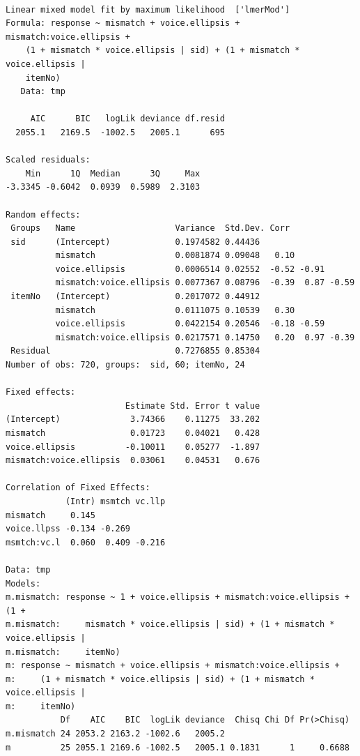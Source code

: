 \documentclass[11pt]{article}
\begin{document}
\begin{verbatim}

Linear mixed model fit by maximum likelihood  ['lmerMod']
Formula: response ~ mismatch + voice.ellipsis + mismatch:voice.ellipsis +  
    (1 + mismatch * voice.ellipsis | sid) + (1 + mismatch * voice.ellipsis |  
    itemNo)
   Data: tmp

     AIC      BIC   logLik deviance df.resid 
  2055.1   2169.5  -1002.5   2005.1      695 

Scaled residuals: 
    Min      1Q  Median      3Q     Max 
-3.3345 -0.6042  0.0939  0.5989  2.3103 

Random effects:
 Groups   Name                    Variance  Std.Dev. Corr             
 sid      (Intercept)             0.1974582 0.44436                   
          mismatch                0.0081874 0.09048   0.10            
          voice.ellipsis          0.0006514 0.02552  -0.52 -0.91      
          mismatch:voice.ellipsis 0.0077367 0.08796  -0.39  0.87 -0.59
 itemNo   (Intercept)             0.2017072 0.44912                   
          mismatch                0.0111075 0.10539   0.30            
          voice.ellipsis          0.0422154 0.20546  -0.18 -0.59      
          mismatch:voice.ellipsis 0.0217571 0.14750   0.20  0.97 -0.39
 Residual                         0.7276855 0.85304                   
Number of obs: 720, groups:  sid, 60; itemNo, 24

Fixed effects:
                        Estimate Std. Error t value
(Intercept)              3.74366    0.11275  33.202
mismatch                 0.01723    0.04021   0.428
voice.ellipsis          -0.10011    0.05277  -1.897
mismatch:voice.ellipsis  0.03061    0.04531   0.676

Correlation of Fixed Effects:
            (Intr) msmtch vc.llp
mismatch     0.145              
voice.llpss -0.134 -0.269       
msmtch:vc.l  0.060  0.409 -0.216

Data: tmp
Models:
m.mismatch: response ~ 1 + voice.ellipsis + mismatch:voice.ellipsis + (1 + 
m.mismatch:     mismatch * voice.ellipsis | sid) + (1 + mismatch * voice.ellipsis | 
m.mismatch:     itemNo)
m: response ~ mismatch + voice.ellipsis + mismatch:voice.ellipsis + 
m:     (1 + mismatch * voice.ellipsis | sid) + (1 + mismatch * voice.ellipsis | 
m:     itemNo)
           Df    AIC    BIC  logLik deviance  Chisq Chi Df Pr(>Chisq)
m.mismatch 24 2053.2 2163.2 -1002.6   2005.2                         
m          25 2055.1 2169.6 -1002.5   2005.1 0.1831      1     0.6688


\end{verbatim}
\end{document}
